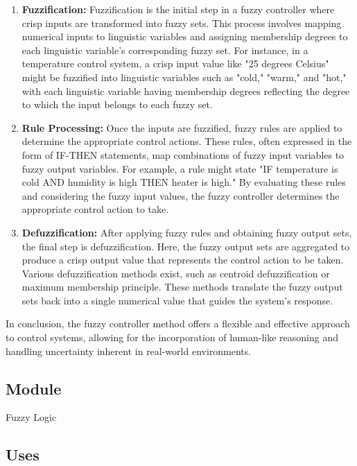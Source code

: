 \documentclass[12pt, titlepage]{article}
\begin{document}
\begin{enumerate}
  \item \textbf{Fuzzification:}
  Fuzzification is the initial step in a fuzzy controller where
  crisp inputs are transformed into fuzzy sets. This process 
  involves mapping numerical inputs to linguistic variables and 
  assigning membership degrees to each linguistic variable's 
  corresponding fuzzy set. For instance, in a temperature 
  control system, a crisp input value like "25 degrees Celsius" 
  might be fuzzified into linguistic variables such as "cold," 
  "warm," and "hot," with each linguistic variable having 
  membership degrees reflecting the degree to which the 
  input belongs to each fuzzy set.
   
  \item \textbf{Rule Processing:}
  Once the inputs are fuzzified, fuzzy rules are applied 
  to determine the appropriate control actions. These rules, 
  often expressed in the form of IF-THEN statements, map combinations 
  of fuzzy input variables to fuzzy output variables. For example, 
  a rule might state "IF temperature is cold AND humidity is high 
  THEN heater is high." By evaluating these rules and considering 
  the fuzzy input values, the fuzzy controller determines the 
  appropriate control action to take.
   
  \item \textbf{Defuzzification:}
  After applying fuzzy rules and obtaining fuzzy output sets, 
  the final step is defuzzification. Here, the fuzzy output sets 
  are aggregated to produce a crisp output value that represents 
  the control action to be taken. Various defuzzification 
  methods exist, such as centroid defuzzification or maximum 
  membership principle. These methods translate the fuzzy output 
  sets back into a single numerical value that guides the system's response.
\end{enumerate}

In conclusion, the fuzzy controller method offers a flexible and effective approach to control systems, allowing for the incorporation of human-like reasoning and handling uncertainty inherent in real-world environments.

\subsection{Module}

Fuzzy Logic

\subsection{Uses}
\end{document}
